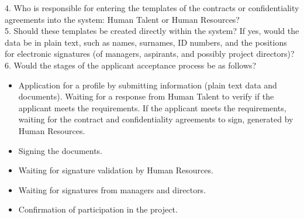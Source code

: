 \documentclass{scrreprt}
\begin{document}
4. Who is responsible for entering the templates of the contracts or confidentiality agreements into the system: Human Talent or Human Resources?\\

5. Should these templates be created directly within the system? If yes, would the data be in plain text, such as names, surnames, ID numbers, and the positions for electronic signatures (of managers, aspirants, and possibly project directors)?\\

6. Would the stages of the applicant acceptance process be as follows?
\begin{itemize}
    \item Application for a profile by submitting information (plain text data and documents).
    Waiting for a response from Human Talent to verify if the applicant meets the requirements.
    If the applicant meets the requirements, waiting for the contract and confidentiality agreements to sign, generated by Human Resources.
    \item Signing the documents.
    \item  Waiting for signature validation by Human Resources.
    \item  Waiting for signatures from managers and directors.
    \item Confirmation of participation in the project.
\end{itemize}
\end{document}
